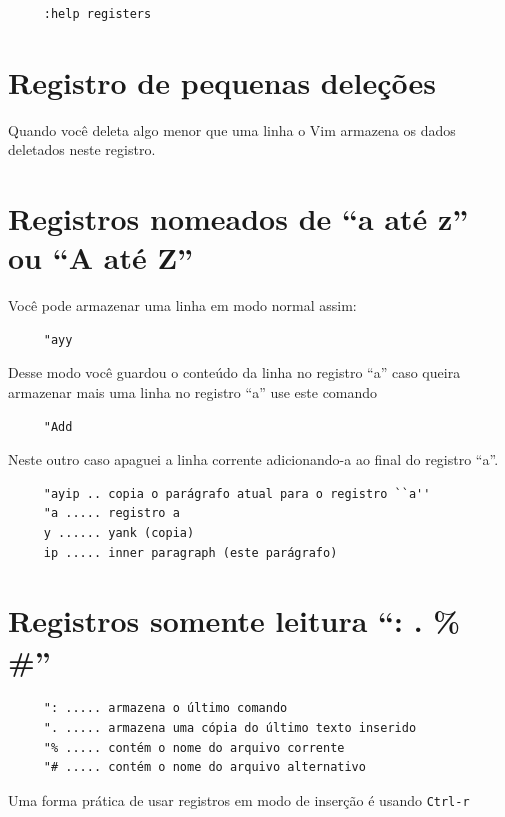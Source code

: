 \documentclass[10pt,a4paper,openany]{book}
\begin{document}
\begin{verbatim}
     :help registers
\end{verbatim}

\section{Registro de pequenas deleções}
\label{Registro de pequenas deleções}
Quando você deleta algo menor que uma linha o Vim armazena os dados deletados neste registro.

\section{Registros nomeados de ``a até z'' ou ``A até Z''}
\label{Registros nomeados de ``a até z'' ou ``A até Z''}
Você pode armazenar uma linha em modo normal assim:

\begin{verbatim}
     "ayy
\end{verbatim}

Desse modo você guardou o conteúdo da linha no registro ``a'' caso
queira armazenar mais uma linha no registro ``a'' use este comando

\begin{verbatim}
     "Add
\end{verbatim}

Neste outro caso apaguei a linha corrente adicionando-a ao final do registro ``a''.

\begin{verbatim}
     "ayip .. copia o parágrafo atual para o registro ``a''
     "a ..... registro a
     y ...... yank (copia)
     ip ..... inner paragraph (este parágrafo)
\end{verbatim}

\section{Registros somente leitura ``: . \% \#''}
\label{Registros somente leitura}

\begin{verbatim}
     ": ..... armazena o último comando
     ". ..... armazena uma cópia do último texto inserido
     "% ..... contém o nome do arquivo corrente
     "# ..... contém o nome do arquivo alternativo
\end{verbatim}

Uma forma prática de usar registros em modo de inserção é usando
\verb|Ctrl-r|
\end{document}
